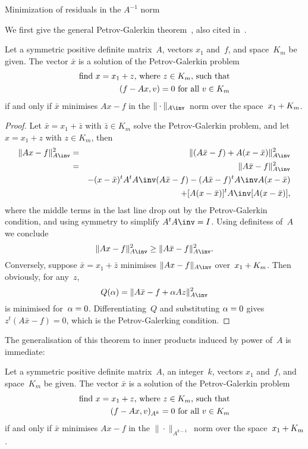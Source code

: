  {Minimization of residuals in the $A^{-1}$ norm}

We first give the general Petrov-Galerkin theorem~\cite{Lu:programming},
also cited in~\cite{SaadSchultz:cg-like}.

\begin{theorem}\label{th:min-spd}
Let a symmetric positive definite matrix~$A$,
vectors $x_1$ and~$f$, and space~$K_m$ be given.
The vector $\bar x$ is a solution of the Petrov-Galerkin problem
\begin{eqnarray*}
    \hbox{find $x=x_1+z$, where $z\in K_m$, such that}\\
    \hbox{$(f-Ax,v)=0$ for all $v\in K_m$}
\end{eqnarray*}
if and only if $\bar x$ minimises $Ax-f$ 
in the $\|\cdot\|_{A\inv}$~norm over the space~$x_1+\nobreak K_m$.
\end{theorem}

\begin{proof} Let $\bar x=x_1+\bar z$ with $\bar z\in K_m$
solve the Petrov-Galerkin problem,
and let $x=x_1+z$ with $z\in K_m$, then
\begin{eqnarray*}
    \|Ax-f\|_{A\inv}^2 &=& \|(A\bar x-f)+A(x-\bar x)\|_{A\inv}^2\\
    &=& \|A\bar x-f\|_{A\inv}^2 \\
    &&  -(x-\bar x)^tA^tA\inv(A\bar x-f) - (A\bar x-f)^tA\inv A(x-\bar x)\\
    &&  +[A(x-\bar x)]^tA\inv [A(x-\bar x)],
\end{eqnarray*}
where the middle terms in the last line drop out by the 
Petrov-Galerkin condition, and using symmetry to simplify $A^tA\inv=I$.
Using definitess of~$A$ we conclude
\[ \|Ax-f\|_{A\inv}^2 \geq \|A\bar x-f\|_{A\inv}^2. \]
Conversely, suppose $\bar x=x_1+\bar z$ minimises $\|Ax-f\|_{A\inv}$
over~$x_1+\nobreak K_m$. Then obviously, for any~$z$,
\[ Q(\alpha) = \|A\bar x-f+\alpha Az\|_{A\inv}^2 \]
is minimised for~$\alpha=\nobreak0$. Differentiating~$Q$ and
substituting $\alpha=\nobreak0$ gives $z^t(A\bar x-f)=0$,
which is the Petrov-Galerking condition.
\end{proof}

The generalisation of this theorem to inner products induced by
power of~$A$ is immediate:
\begin{theorem}
Let a symmetric positive definite matrix~$A$, an integer~$k$,
vectors $x_1$ and~$f$, and space~$K_m$ be given.
The vector $\bar x$ is a solution of the Petrov-Galerkin problem
\begin{eqnarray*}
    \hbox{find $x=x_1+z$, where $z\in K_m$, such that}\\
    \hbox{$(f-Ax,v)_{A^k}=0$ for all $v\in K_m$}
\end{eqnarray*}
if and only if $\bar x$ minimises $Ax-f$ 
in the $\|\cdot\|_{A^{k-1}}$~norm over the space~$x_1+\nobreak K_m$.
\end{theorem}

